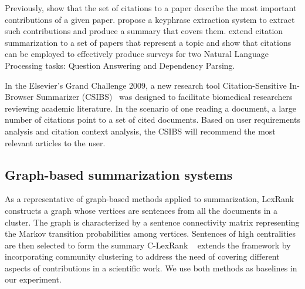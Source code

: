 
Previously,  show that the set of
citations to a paper describe the most important contributions of a
given paper.   propose a keyphrase
extraction system to extract such contributions and produce a summary
that covers them.
 extend citation summarization
to a set of papers that represent a topic and show that citations can
be employed to effectively produce surveys for two Natural Language
Processing tasks: Question Answering and Dependency Parsing.


In the Elsevier's Grand Challenge 2009, a new research tool 
Citation-Sensitive In-Browser Summarizer (CSIBS)~\cite{WanPD10}
 was designed to facilitate biomedical researchers reviewing academic literature.
In the scenario of one reading a document, a large number of citations 
point to a set of cited documents. 
Based on user requirements analysis and citation context analysis,
the CSIBS will recommend the most relevant articles
to the user.

\subsection{Graph-based summarization systems}

As a representative of graph-based methods applied to summarization,
LexRank~\cite{Erkan&Radev04c} constructs a graph whose vertices are
sentences from all the documents in a cluster. The graph is
characterized by a sentence connectivity matrix representing  the Markov
transition probabilities among vertices. Sentences of high
centralities are then selected to form the summary
C-LexRank ~\cite{Qazvinian&Radev08a} extends the framework by
incorporating community clustering to address the need of covering
different aspects of contributions in a scientific work.  We use both
methods as baselines in our experiment. 

